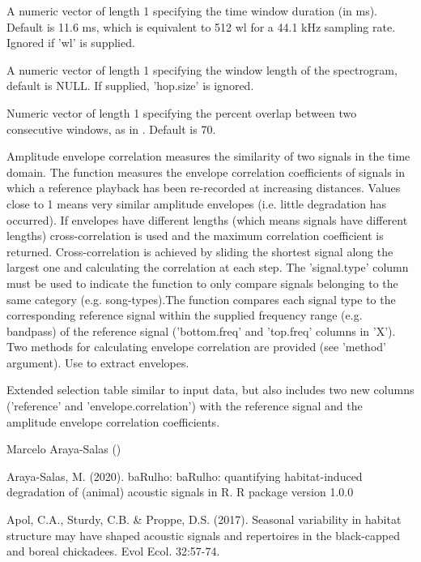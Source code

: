 \documentclass[letterpaper]{book}
\begin{document}
\begin{Arguments}
\begin{ldescription}
\item[\code{hop.size}] A numeric vector of length 1 specifying the time window duration (in ms). Default is 11.6 ms, which is equivalent to 512 wl for a 44.1 kHz sampling rate. Ignored if 'wl' is supplied.

\item[\code{wl}] A numeric vector of length 1 specifying the window length of the spectrogram, default 
is NULL. If supplied, 'hop.size' is ignored.

\item[\code{ovlp}] Numeric vector of length 1 specifying the percent overlap between two 
consecutive windows, as in . Default is 70.
\end{ldescription}
\end{Arguments}
%
\begin{Details}\relax
Amplitude envelope correlation measures the similarity of two signals in the time domain. The  function measures the envelope correlation coefficients of signals in which a reference playback has been re-recorded at increasing distances. Values close to 1 means very similar amplitude envelopes (i.e. little degradation has occurred). If envelopes have different lengths (which means signals have different lengths) cross-correlation is used and the maximum correlation coefficient is returned. Cross-correlation is achieved by sliding the shortest signal along the largest one and calculating the correlation at each step. The 'signal.type' column must be used to indicate the function to only compare signals belonging to the same category (e.g. song-types).The function compares each signal type to the corresponding reference signal within the supplied frequency range (e.g. bandpass) of the reference signal ('bottom.freq' and 'top.freq' columns in 'X'). Two methods for calculating envelope correlation are provided (see 'method' argument). Use  to extract envelopes.
\end{Details}
%
\begin{Value}
Extended selection table similar to input data, but also includes two new columns ('reference' and  'envelope.correlation')
with the reference signal and the amplitude envelope correlation coefficients.
\end{Value}
%
\begin{Author}\relax
Marcelo Araya-Salas ()
\end{Author}
%
\begin{References}\relax

Araya-Salas, M. (2020). baRulho: baRulho: quantifying habitat-induced degradation of (animal) acoustic signals in R. R package version 1.0.0

Apol, C.A., Sturdy, C.B. \& Proppe, D.S. (2017). Seasonal variability in habitat structure may have shaped acoustic signals and repertoires in the black-capped and boreal chickadees. Evol Ecol. 32:57-74.

\end{References}
\end{document}
